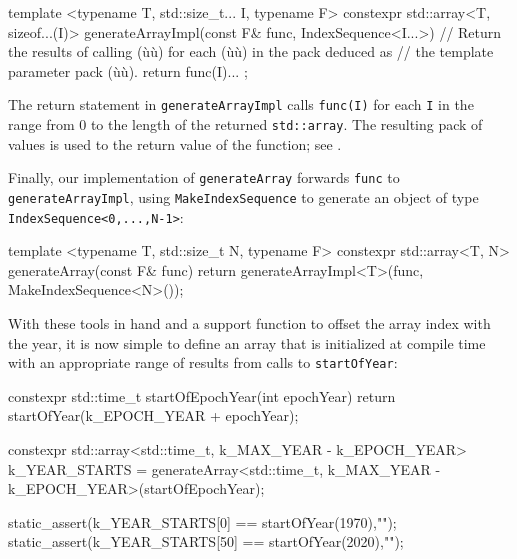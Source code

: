 \begin{emcppslisting}[emcppsbatch=e14]
template <typename T, std::size_t... I, typename F>
constexpr std::array<T, sizeof...(I)> generateArrayImpl(const F& func,
                                                        IndexSequence<I...>)
    // Return the results of calling (ù{}ù) for each (ù{}ù) in the pack deduced as
    // the template parameter pack (ù{}ù).
{
    return { func(I)... };
}
\end{emcppslisting}
    

\noindent The return statement in \lstinline!generateArrayImpl! calls
\lstinline!func(I)! for each \lstinline!I! in the range from 0 to the length
of the returned \lstinline!std::array!. The resulting pack of values is
used to  the return value of the function; see
.

Finally, our implementation of \lstinline!generateArray! forwards
\lstinline!func! to \lstinline!generateArrayImpl!, using
\lstinline!MakeIndexSequence! to generate an object of type
\lstinline!IndexSequence<0,...,N-1>!:

\begin{emcppslisting}[emcppsbatch=e14]
template <typename T, std::size_t N, typename F>
constexpr std::array<T, N> generateArray(const F& func)
{
    return generateArrayImpl<T>(func, MakeIndexSequence<N>());
}
\end{emcppslisting}
    

\noindent With these tools in hand and a support function to offset the array
index with the year, it is now simple to define an array that is
initialized at compile time with an appropriate range of results from
calls to \lstinline!startOfYear!:

\begin{emcppslisting}[emcppsbatch=e14]
constexpr std::time_t startOfEpochYear(int epochYear)
{
    return startOfYear(k_EPOCH_YEAR + epochYear);
}

constexpr std::array<std::time_t, k_MAX_YEAR - k_EPOCH_YEAR> k_YEAR_STARTS =
    generateArray<std::time_t, k_MAX_YEAR - k_EPOCH_YEAR>(startOfEpochYear);

static_assert(k_YEAR_STARTS[0]  == startOfYear(1970),"");
static_assert(k_YEAR_STARTS[50] == startOfYear(2020),"");
\end{emcppslisting}
    

